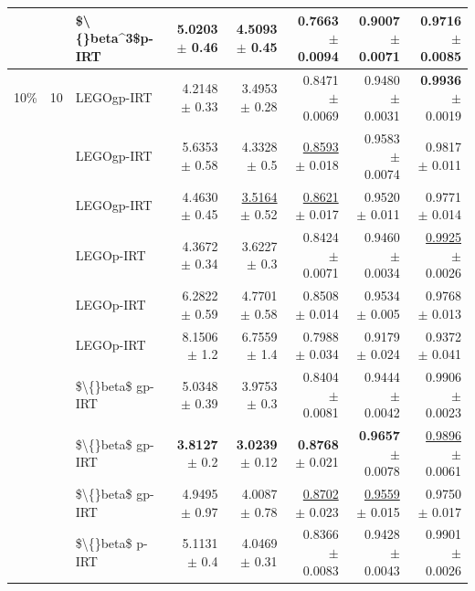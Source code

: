 \begin{longtable}{llp{}rrrrr}
 &  & \$\textbackslash\{\}beta\textasciicircum{}3\$p-IRT & 5.0203 {\scriptsize $\pm$ 0.46} & 4.5093 {\scriptsize $\pm$ 0.45} & 0.7663 {\scriptsize $\pm$ 0.0094} & 0.9007 {\scriptsize $\pm$ 0.0071} & 0.9716 {\scriptsize $\pm$ 0.0085} \\
\midrule
10\% & 10 & LEGOgp-IRT & 4.2148 {\scriptsize $\pm$ 0.33} & 3.4953 {\scriptsize $\pm$ 0.28} & 0.8471 {\scriptsize $\pm$ 0.0069} & 0.9480 {\scriptsize $\pm$ 0.0031} & \textbf{0.9936} {\scriptsize $\pm$ 0.0019} \\
 &  & LEGOgp-IRT & 5.6353 {\scriptsize $\pm$ 0.58} & 4.3328 {\scriptsize $\pm$ 0.5} & \underline{0.8593} {\scriptsize $\pm$ 0.018} & 0.9583 {\scriptsize $\pm$ 0.0074} & 0.9817 {\scriptsize $\pm$ 0.011} \\
 &  & LEGOgp-IRT & 4.4630 {\scriptsize $\pm$ 0.45} & \underline{3.5164} {\scriptsize $\pm$ 0.52} & \underline{0.8621} {\scriptsize $\pm$ 0.017} & 0.9520 {\scriptsize $\pm$ 0.011} & 0.9771 {\scriptsize $\pm$ 0.014} \\
 &  & LEGOp-IRT & 4.3672 {\scriptsize $\pm$ 0.34} & 3.6227 {\scriptsize $\pm$ 0.3} & 0.8424 {\scriptsize $\pm$ 0.0071} & 0.9460 {\scriptsize $\pm$ 0.0034} & \underline{0.9925} {\scriptsize $\pm$ 0.0026} \\
 &  & LEGOp-IRT & 6.2822 {\scriptsize $\pm$ 0.59} & 4.7701 {\scriptsize $\pm$ 0.58} & 0.8508 {\scriptsize $\pm$ 0.014} & 0.9534 {\scriptsize $\pm$ 0.005} & 0.9768 {\scriptsize $\pm$ 0.013} \\
 &  & LEGOp-IRT & 8.1506 {\scriptsize $\pm$ 1.2} & 6.7559 {\scriptsize $\pm$ 1.4} & 0.7988 {\scriptsize $\pm$ 0.034} & 0.9179 {\scriptsize $\pm$ 0.024} & 0.9372 {\scriptsize $\pm$ 0.041} \\
 &  & \$\textbackslash\{\}beta\$ gp-IRT & 5.0348 {\scriptsize $\pm$ 0.39} & 3.9753 {\scriptsize $\pm$ 0.3} & 0.8404 {\scriptsize $\pm$ 0.0081} & 0.9444 {\scriptsize $\pm$ 0.0042} & 0.9906 {\scriptsize $\pm$ 0.0023} \\
 &  & \$\textbackslash\{\}beta\$ gp-IRT & \textbf{3.8127} {\scriptsize $\pm$ 0.2} & \textbf{3.0239} {\scriptsize $\pm$ 0.12} & \textbf{0.8768} {\scriptsize $\pm$ 0.021} & \textbf{0.9657} {\scriptsize $\pm$ 0.0078} & \underline{0.9896} {\scriptsize $\pm$ 0.0061} \\
 &  & \$\textbackslash\{\}beta\$ gp-IRT & 4.9495 {\scriptsize $\pm$ 0.97} & 4.0087 {\scriptsize $\pm$ 0.78} & \underline{0.8702} {\scriptsize $\pm$ 0.023} & \underline{0.9559} {\scriptsize $\pm$ 0.015} & 0.9750 {\scriptsize $\pm$ 0.017} \\
 &  & \$\textbackslash\{\}beta\$ p-IRT & 5.1131 {\scriptsize $\pm$ 0.4} & 4.0469 {\scriptsize $\pm$ 0.31} & 0.8366 {\scriptsize $\pm$ 0.0083} & 0.9428 {\scriptsize $\pm$ 0.0043} & 0.9901 {\scriptsize $\pm$ 0.0026} \\

\end{longtable}

